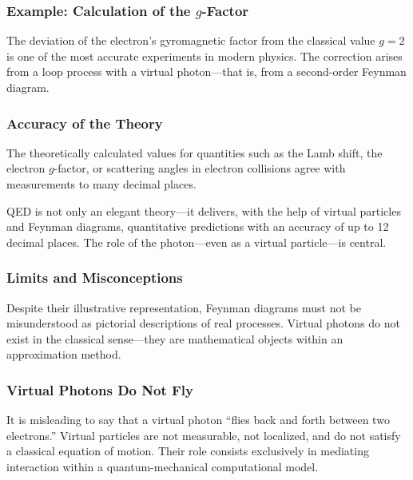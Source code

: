 \subsubsection*{Example: Calculation of the $g$-Factor}
The deviation of the electron’s gyromagnetic factor from the classical value $g = 2$ is one of the most accurate experiments in modern physics. The correction arises from a loop process with a virtual photon—that is, from a second-order Feynman diagram.

\subsubsection*{Accuracy of the Theory}
The theoretically calculated values for quantities such as the Lamb shift, the electron $g$-factor, or scattering angles in electron collisions agree with measurements to many decimal places.

\vspace{1em}
\begin{tcolorbox}[didaktikbox, title=Quantum Electrodynamics as a Success Story]
	\label{box:Die Quantenelekrodynamik}
	QED is not only an elegant theory—it delivers, with the help of virtual particles and Feynman diagrams, quantitative predictions with an accuracy of up to 12 decimal places. The role of the photon—even as a virtual particle—is central.
\end{tcolorbox}

\subsubsection{Limits and Misconceptions}

Despite their illustrative representation, Feynman diagrams must not be misunderstood as pictorial descriptions of real processes. Virtual photons do not exist in the classical sense—they are mathematical objects within an approximation method.

\subsubsection*{Virtual Photons Do Not Fly}
It is misleading to say that a virtual photon “flies back and forth between two electrons.” Virtual particles are not measurable, not localized, and do not satisfy a classical equation of motion. Their role consists exclusively in mediating interaction within a quantum-mechanical computational model.

